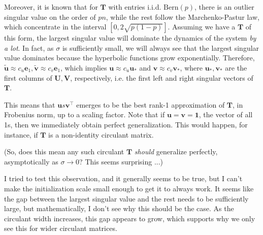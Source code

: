 \documentclass{article}
\begin{document}
Moreover, it is known that for $\bm{T}$ with entries i.i.d. $\text{Bern}(p)$, there is an outlier singular value on the order of $p n$, while the rest follow the Marchenko-Pastur law, which concentrate in the interval $[0, 2 \sqrt{p(1-p)}]$.
Assuming we have a $\bm{T}$ of this form, the largest singular value will dominate the dynamics of the system \emph{by a lot}.
In fact, as $\sigma$ is sufficiently small, we will always see that the largest singular value dominates because the hyperbolic functions grow exponentially.
Therefore, $\tilde{\bm{u}} \approx c_u \bm{e}_1, \tilde{\bm{v}} \approx c_v \bm{e}_1$, which implies $\bm{u} \approx c_u \bm{u}_*$ and $\bm{v} \approx c_v \bm{v}_*$, where $\bm{u}_*, \bm{v}_*$ are the first columns of $\bm{U}, \bm{V}$, respectively, i.e. the first left and right singular vectors of $\bm{T}$.

This means that $\bm{u} s \bm{v}^\top$ emerges to be the best rank-1 approximation of $\bm{T}$, in Frobenius norm, up to a scaling factor.
Note that if $\bm{u} = \bm{v} = \bm{1}$, the vector of all 1s, then we immediately obtain perfect generalization.
This would happen, for instance, if $\bm{T}$ is a non-identity circulant matrix.

(So, does this mean any such circulant $\bm{T}$ \emph{should} generalize perfectly, asymptotically as $\sigma\to0$?
This seems surprising ...)

I tried to test this observation, and it generally seems to be true, but I can't make the initialization scale small enough to get it to always work.
It seems like the gap between the largest singular value and the rest needs to be sufficiently large, but mathematically, I don't see why this should be the case.
As the circulant width increases, this gap appears to grow, which supports why we only see this for wider circulant matrices.
\end{document}
